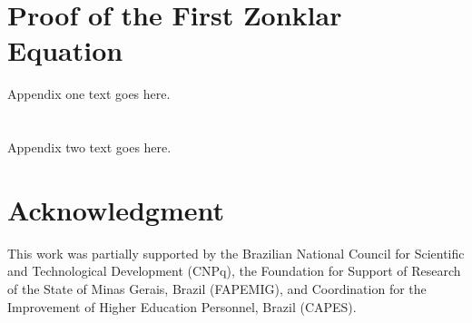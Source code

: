 \documentclass[journal]{IEEEtran}
\begin{document}
\appendices
\section{Proof of the First Zonklar Equation}
Appendix one text goes here.

\section{}
Appendix two text goes here.


\section*{Acknowledgment}
This work was partially supported by 
the Brazilian National Council for Scientific and Technological Development (CNPq), 
the Foundation for Support of Research of the State of Minas Gerais, Brazil (FAPEMIG), and 
Coordination for the Improvement of Higher Education Personnel, Brazil (CAPES).


\ifCLASSOPTIONcaptionsoff
  \newpage
\fi








% 
\end{document}
